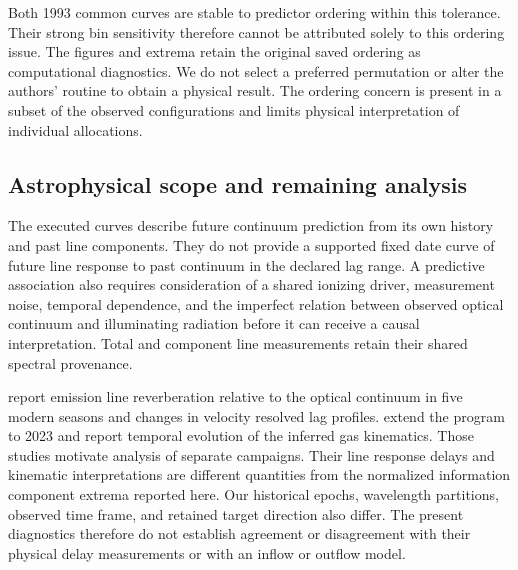\begin{table}[H]
\centering
\caption{Predictor ordering sensitivity of the retained astronomical
histograms. Each row contains 30 positive lag configurations, each checked
in all 24 predictor orders. Affected lags have component total variation
above $10^{-8}$ in at least one order. The final column is the maximum
over all lags and orders in that row.}
\label{tab:cr_order}
\small

\end{table}

Both 1993 common curves are stable to predictor ordering within this
tolerance. Their strong bin sensitivity therefore cannot be attributed
solely to this ordering issue. The figures and extrema retain the
original saved ordering as computational diagnostics. We do not select a
preferred permutation or alter the authors' routine to obtain a physical
result. The ordering concern is present in a subset of the observed
configurations and limits physical interpretation of individual allocations.

\subsection{Astrophysical scope and remaining analysis}

The executed curves describe future continuum prediction from its own
history and past line components. They do not provide a supported fixed
date curve of future line response to past continuum in the declared lag
range. A predictive association also requires consideration of a shared
ionizing driver, measurement noise, temporal dependence, and the imperfect
relation between observed optical continuum and illuminating radiation
before it can receive a causal interpretation. Total and component line
measurements retain their shared spectral provenance.

\citet{Lu2022} report emission line reverberation relative to the optical
continuum in five modern seasons and changes in velocity resolved lag
profiles. \citet{Xi2025} extend the program to 2023 and report temporal
evolution of the inferred gas kinematics. Those studies motivate analysis
of separate campaigns. Their line response delays and kinematic
interpretations are different quantities from the normalized information
component extrema reported here. Our historical epochs, wavelength
partitions, observed time frame, and retained target direction also differ.
The present diagnostics therefore do not establish agreement or disagreement
with their physical delay measurements or with an inflow or outflow model.

